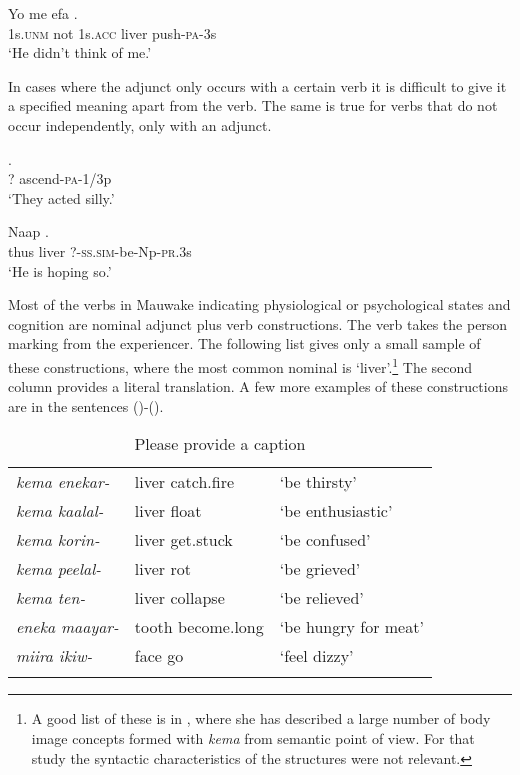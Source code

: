 \ea%
\label{ex:x1874}
\gll Yo me efa  . \\
1s.\textsc{unm} not 1s.\textsc{acc} liver push-\textsc{pa}-3s\\
\glt`He didn't think of me.'
\z

In cases where the adjunct only occurs with a certain verb it is difficult to give it a specified meaning apart from the verb. The same is true for verbs that do not occur independently, only with an adjunct.

\ea%
\label{ex:x454}
\gll {} . \\
? ascend-\textsc{pa}-1/3p\\
\glt`They acted silly.'
\z

\ea%
\label{ex:x455}
\gll Naap  . \\
thus liver ?-\textsc{ss}.\textsc{sim}-be-Np-\textsc{pr}.3s\\
\glt`He is hoping so.'
\z

Most of the verbs in Mauwake indicating physiological or psychological states and cognition are nominal adjunct plus verb constructions. The verb takes the person marking from the experiencer. The following list gives only a small sample of these constructions, where the most common nominal is  `liver'.\footnote{A good list of these is in \citet[47--63]{Kwan1989}, where she has described a large number of body image concepts formed with \textit{kema} from semantic point of view. For that study the syntactic characteristics of the structures were not relevant.} The second column provides a literal translation. A few more examples of these constructions are in the sentences ()-().

\begin{table}
\begin{tabular}{>{\it}lll}
\mytoprule
kema enekar- &liver catch.fire &`be thirsty'\\
kema kaalal- &liver float &`be enthusiastic'\\
kema korin- &liver get.stuck &`be confused'\\
kema peelal- &liver rot &`be grieved'\\
kema ten- &liver collapse &`be relieved'\\
eneka maayar- &tooth become.long &`be hungry for meat'\\
miira ikiw- &face go &`feel dizzy'\\
\mybottomrule
\end{tabular}
\caption{Please provide a caption}
\label{tab:3:nominaladjunctplusverbconstrucion}
\end{table}


